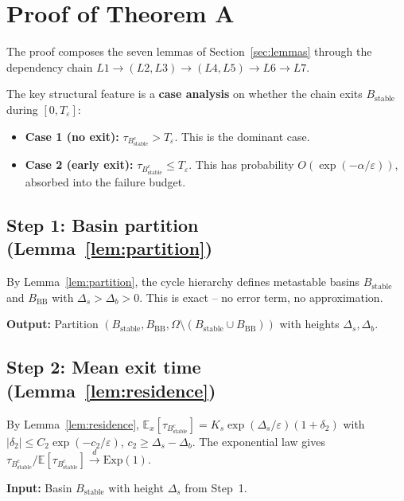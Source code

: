 \documentclass[11pt]{article}
\newcommand{\eps}{\varepsilon}
\newcommand{\Ds}{\Delta_s}
\newcommand{\Db}{\Delta_b}
\newcommand{\Bstable}{B_{\mathrm{stable}}}
\newcommand{\BBB}{B_{\mathrm{BB}}}
\newcommand{\Teps}{T_\eps}
\begin{document}
\section{Proof of Theorem A}
\label{sec:proof}

The proof composes the seven lemmas of Section~\ref{sec:lemmas}
through the dependency chain
$L1 \to (L2, L3) \to (L4, L5) \to L6 \to L7$.

The key structural feature is a \textbf{case analysis} on whether
the chain exits $\Bstable$ during $[0, \Teps]$:
\begin{itemize}
\item \textbf{Case 1 (no exit):} $\tau_{\Bstable^c} > \Teps$.
  This is the dominant case.
\item \textbf{Case 2 (early exit):} $\tau_{\Bstable^c} \leq \Teps$.
  This has probability $O(\exp(-\alpha/\eps))$, absorbed into the
  failure budget.
\end{itemize}

\subsection*{Step 1: Basin partition (Lemma~\ref{lem:partition})}

By Lemma~\ref{lem:partition}, the cycle hierarchy defines
metastable basins $\Bstable$ and $\BBB$ with $\Ds > \Db > 0$.
This is exact -- no error term, no approximation.

\textbf{Output:} Partition $(\Bstable, \BBB,
\Omega \setminus (\Bstable \cup \BBB))$ with heights $\Ds, \Db$.

\subsection*{Step 2: Mean exit time (Lemma~\ref{lem:residence})}

By Lemma~\ref{lem:residence},
$\mathbb{E}_x[\tau_{\Bstable^c}]
= K_s \exp(\Ds/\eps)(1 + \delta_2)$
with $|\delta_2| \leq C_2 \exp(-c_2/\eps)$, $c_2 \geq \Ds - \Db$.
The exponential law gives
$\tau_{\Bstable^c}/\mathbb{E}[\tau_{\Bstable^c}]
\xrightarrow{d} \mathrm{Exp}(1)$.

\textbf{Input:} Basin $\Bstable$ with height $\Ds$ from Step~1.
\end{document}
